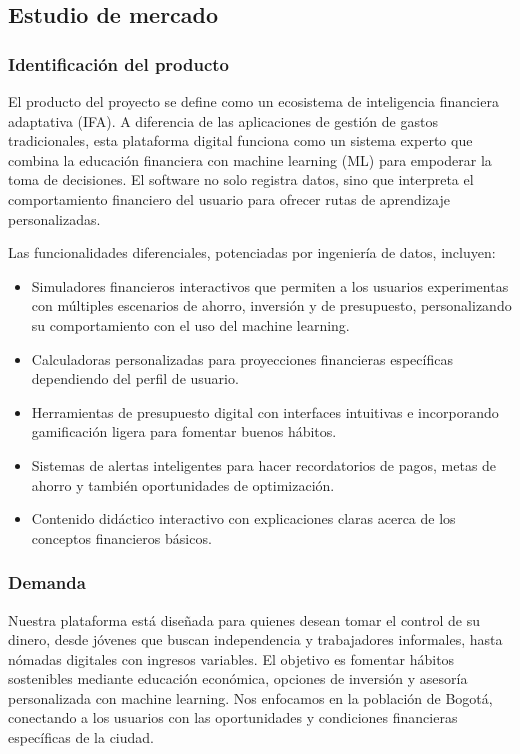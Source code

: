 \subsection*{Estudio de mercado}

\subsubsection*{Identificación del producto}
El producto del proyecto se define como un ecosistema de inteligencia financiera adaptativa (IFA). A diferencia de las aplicaciones de gestión de gastos tradicionales, esta plataforma digital funciona como un sistema experto que combina la educación financiera con machine learning (ML) para empoderar la toma de decisiones. El software no solo registra datos, sino que interpreta el comportamiento financiero del usuario para ofrecer rutas de aprendizaje personalizadas.

Las funcionalidades diferenciales, potenciadas por ingeniería de datos, incluyen:

\begin{itemize}
	\item Simuladores financieros interactivos que permiten a los usuarios experimentas con múltiples escenarios de ahorro, inversión y de presupuesto, personalizando su comportamiento con el uso del machine learning.
	
	\item Calculadoras personalizadas para proyecciones financieras específicas dependiendo del perfil de usuario.
	
	\item Herramientas de presupuesto digital con interfaces intuitivas e incorporando gamificación ligera para fomentar buenos hábitos.
	
	\item Sistemas de alertas inteligentes para hacer recordatorios de pagos, metas de ahorro y también oportunidades de optimización.
	
	\item Contenido didáctico interactivo con explicaciones claras acerca de los conceptos financieros básicos.
	
\end{itemize}

\subsubsection*{Demanda}
Nuestra plataforma está diseñada para quienes desean tomar el control de su dinero, desde jóvenes que buscan independencia y trabajadores informales, hasta nómadas digitales con ingresos variables. El objetivo es fomentar hábitos sostenibles mediante educación económica, opciones de inversión y asesoría personalizada con machine learning. Nos enfocamos en la población de Bogotá, conectando a los usuarios con las oportunidades y condiciones financieras específicas de la ciudad.


